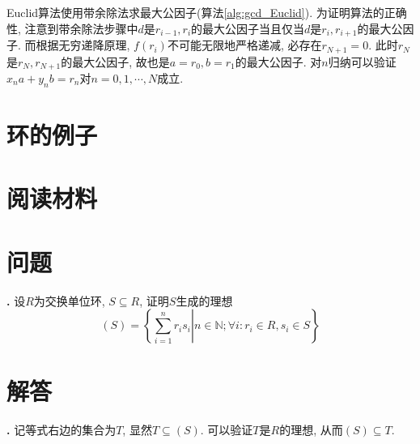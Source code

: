 Euclid算法使用带余除法求最大公因子(算法\ref{alg:gcd_Euclid}). 为证明算法的正确性, 注意到带余除法步骤中$d$是$r_{i-1},r_{i}$的最大公因子当且仅当$d$是$r_i,r_{i+1}$的最大公因子. 而根据无穷递降原理, $f(r_i)$不可能无限地严格递减, 必存在$r_{N+1}=0$. 此时$r_N$是$r_N,r_{N+1}$的最大公因子, 故也是$a=r_0, b=r_1$的最大公因子. 对$n$归纳可以验证$x_na+y_nb=r_n$对$n=0,1,\cdots,N$成立.  


\section{环的例子}


\section*{阅读材料}

\section*{问题}
\par \textbf{\theprobrng .} 设$R$为交换单位环, $S\subseteq R$, 证明$S$生成的理想
\begin{equation}
    (S)=\left\{\left.\sum_{i=1}^n r_is_i\right\vert n\in \mathbb{N}; \forall i: r_i\in R, s_i\in S\right\}
\end{equation}

\section*{解答}
\par \textbf{\thesolrng .} 记等式右边的集合为$T$, 显然$T\subseteq (S)$. 可以验证$T$是$R$的理想, 从而$(S) \subseteq T$. 
